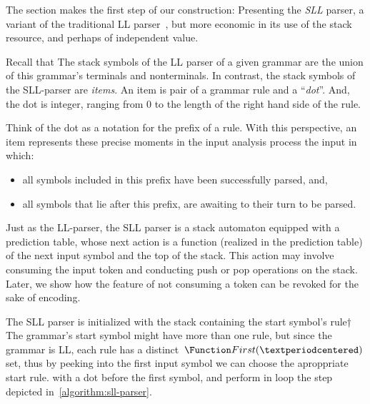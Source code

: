 The section makes the first step of our construction: Presenting the \emph{SLL}
  parser, a variant of the traditional LL parser~\cite{lewis:66}, but more economic in its
  use of the stack resource, and
  perhaps of independent value.

Recall that The stack symbols of the LL parser of a given grammar are the union
of this grammar's terminals and nonterminals. In contrast, the stack symbols of
the SLL-parser are \emph{items}. An item is pair of a grammar rule and a
``\emph{dot}''. And, the dot is integer, ranging from 0 to the length of the
right hand side of the rule. 

Think of the dot as a notation for the prefix of a rule. With this perspective,
an item represents these precise moments in the input analysis process the
input in which: 
\begin{itemize}
  \item all symbols included in this prefix have been successfully parsed, and,
  \item all symbols that lie after this prefix, are awaiting to their turn
      to be parsed.
\end{itemize}

Just as the LL-parser, the SLL parser is a stack automaton equipped with a
prediction table, whose next action is a function (realized in the prediction
table) of the next input symbol and the top of the stack. This action may
involve consuming the input token and conducting push or pop operations on the
stack. Later, we show how the feature of not consuming a token can be revoked
for the sake of encoding.

The SLL parser is initialized with the stack containing the start symbol's rule†{%
  The grammar's start symbol might have more than one rule,
  but since the grammar is LL, each rule has a
  distinct~$\Function First(·)$ set, thus by peeking into the
  first input symbol we can choose the aproppriate start rule.}
with a dot before the first symbol, and perform in loop the step depicted
in~\cref{algorithm:sll-parser}.

